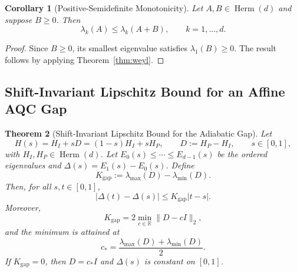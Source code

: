 \documentclass[11pt, a4paper]{article}
\newtheorem{theorem}{Theorem}[section]
\newtheorem{corollary}[theorem]{Corollary}
\newcommand{\norm}[1]{\| #1 \|}
\newcommand{\Herm}{\operatorname{Herm}}
\begin{document}
\begin{corollary}[Positive-Semidefinite Monotonicity]
\label{cor:psd-monotonicity}
Let $A,B\in\Herm(d)$ and suppose $B\ge0$. Then
\begin{equation}
\lambda_k(A)\le \lambda_k(A+B),\qquad k=1,\ldots,d.
\end{equation}
\end{corollary}

\begin{proof}
  Since $B\ge 0$, its smallest eigenvalue satisfies $\lambda_1(B)\ge 0$. The result follows by applying Theorem~\ref{thm:weyl}.
\end{proof}


\subsection{Shift-Invariant Lipschitz Bound for an Affine AQC Gap}

\begin{theorem}[Shift-Invariant Lipschitz Bound for the Adiabatic Gap]
\label{thm:lipschitz-gap}
Let
\begin{equation}
H(s)=H_I+sD=(1-s)H_I+sH_P,
\qquad D:=H_P-H_I,
\qquad s\in[0,1],
\end{equation}
with $H_I,H_P\in\Herm(d)$. Let $E_0(s)\le\cdots\le E_{d-1}(s)$ be the ordered eigenvalues and $\Delta(s)=E_1(s)-E_0(s)$. Define
\begin{equation}
\label{eq:gap-lipschitz-constant}
K_{\mathrm{gap}}:=\lambda_{\max}(D)-\lambda_{\min}(D).
\end{equation}
Then, for all $s,t\in[0,1]$,
\begin{equation}
\label{eq:lipschitz-gap}
|\Delta(t)-\Delta(s)|\le K_{\mathrm{gap}}|t-s|.
\end{equation}
Moreover,
\begin{equation}
\label{eq:shift-invariant-norm}
K_{\mathrm{gap}}
=2\min_{c\in\mathbb R}\norm{D-cI}_2,
\end{equation}
and the minimum is attained at
\begin{equation}
c_* = \frac{\lambda_{\max}(D)+\lambda_{\min}(D)}{2}.
\end{equation}
If $K_{\mathrm{gap}}=0$, then $D=c_*I$ and $\Delta(s)$ is constant on $[0,1]$.
\end{theorem}
\end{document}
